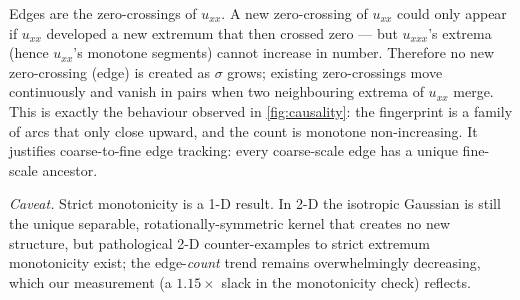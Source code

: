 Edges are the zero-crossings of $u_{xx}$. A new zero-crossing of $u_{xx}$ could
only appear if $u_{xx}$ developed a new extremum that then crossed zero --- but
$u_{xxx}$'s extrema (hence $u_{xx}$'s monotone segments) cannot increase in
number. Therefore no new zero-crossing (edge) is created as $\sigma$ grows;
existing zero-crossings move continuously and vanish in pairs when two
neighbouring extrema of $u_{xx}$ merge. This is exactly the behaviour observed
in \cref{fig:causality}: the fingerprint is a family of arcs that only close
upward, and the count is monotone non-increasing. It justifies coarse-to-fine
edge tracking: every coarse-scale edge has a unique fine-scale ancestor.

\emph{Caveat.} Strict monotonicity is a 1-D result. In 2-D the isotropic
Gaussian is still the unique separable, rotationally-symmetric kernel that
creates no new structure, but pathological 2-D counter-examples to strict
extremum monotonicity exist; the edge-\emph{count} trend remains
overwhelmingly decreasing, which our measurement (a $1.15\times$ slack in the
monotonicity check) reflects.

